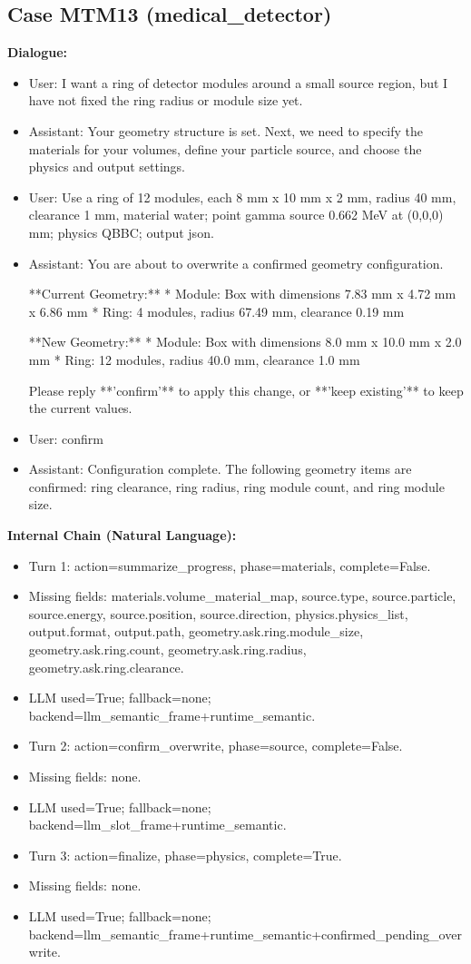 \documentclass[11pt]{ctexart}
\begin{document}
\subsection{Case MTM13 (medical\_detector)}
\textbf{Dialogue:}
\begin{itemize}
\item User: I want a ring of detector modules around a small source region, but I have not fixed the ring radius or module size yet.
\item Assistant: Your geometry structure is set. Next, we need to specify the materials for your volumes, define your particle source, and choose the physics and output settings.
\item User: Use a ring of 12 modules, each 8 mm x 10 mm x 2 mm, radius 40 mm, clearance 1 mm, material water; point gamma source 0.662 MeV at (0,0,0) mm; physics QBBC; output json.
\item Assistant: You are about to overwrite a confirmed geometry configuration.

**Current Geometry:**
*   Module: Box with dimensions 7.83 mm x 4.72 mm x 6.86 mm
*   Ring: 4 modules, radius 67.49 mm, clearance 0.19 mm

**New Geometry:**
*   Module: Box with dimensions 8.0 mm x 10.0 mm x 2.0 mm
*   Ring: 12 modules, radius 40.0 mm, clearance 1.0 mm

Please reply **'confirm'** to apply this change, or **'keep existing'** to keep the current values.
\item User: confirm
\item Assistant: Configuration complete. The following geometry items are confirmed: ring clearance, ring radius, ring module count, and ring module size.
\end{itemize}
\textbf{Internal Chain (Natural Language):}
\begin{itemize}
\item Turn 1: action=summarize\_progress, phase=materials, complete=False.
\item Missing fields: materials.volume\_material\_map, source.type, source.particle, source.energy, source.position, source.direction, physics.physics\_list, output.format, output.path, geometry.ask.ring.module\_size, geometry.ask.ring.count, geometry.ask.ring.radius, geometry.ask.ring.clearance.
\item LLM used=True; fallback=none; backend=llm\_semantic\_frame+runtime\_semantic.
\item Turn 2: action=confirm\_overwrite, phase=source, complete=False.
\item Missing fields: none.
\item LLM used=True; fallback=none; backend=llm\_slot\_frame+runtime\_semantic.
\item Turn 3: action=finalize, phase=physics, complete=True.
\item Missing fields: none.
\item LLM used=True; fallback=none; backend=llm\_semantic\_frame+runtime\_semantic+confirmed\_pending\_overwrite.
\end{itemize}
\end{document}
